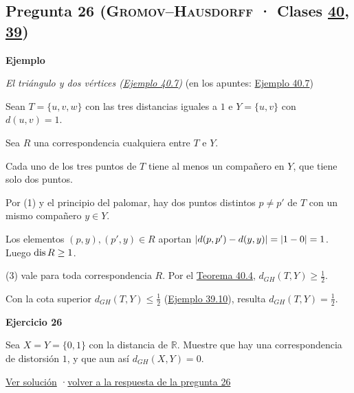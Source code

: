 \documentclass[11pt,a4paper]{article}
\newcommand{\R}{\mathbb{R}}\newcommand{\N}{\mathbb{N}}\newcommand{\Q}{\mathbb{Q}}
\newcommand{\bloque}[1]{\par\smallskip\noindent\textbf{\color{acento}#1}\par}
\begin{document}
\subsection*{\hypertarget{e-26}{}Pregunta 26 \normalfont\small(\textsc{Gromov–Hausdorff} · Clases \href{https://decostruttivismo.github.io/MAT2514-repaso/pdf/MAT2514_apuntes_completos.pdf\#nameddest=section.40}{40}, \href{https://decostruttivismo.github.io/MAT2514-repaso/pdf/MAT2514_apuntes_completos.pdf\#nameddest=section.39}{39})}
\bloque{Ejemplo}
\textit{El triángulo y dos vértices (\href{https://decostruttivismo.github.io/MAT2514-repaso/pdf/MAT2514_apuntes_completos.pdf\#nameddest=teorema.40.7}{Ejemplo 40.7})} {\small(en los apuntes: \href{https://decostruttivismo.github.io/MAT2514-repaso/pdf/MAT2514_apuntes_completos.pdf\#nameddest=teorema.40.7}{Ejemplo 40.7})}
\begin{pasos}
\item[] Sean $T=\{u,v,w\}$ con las tres distancias iguales a $1$ e $Y=\{u,v\}$ con $d(u,v)=1$.
\item[] Sea $R$ una correspondencia cualquiera entre $T$ e $Y$.
\item[(1)] Cada uno de los tres puntos de $T$ tiene al menos un compañero en $Y$, que tiene solo dos puntos.
\item[(2)] Por (1) y el principio del palomar, hay dos puntos distintos $p\ne p'$ de $T$ con un mismo compañero $y\in Y$.
\item[(3)] Los elementos $(p,y),(p',y)\in R$ aportan $\lvert d(p,p')-d(y,y)\rvert=\lvert 1-0\rvert=1$. Luego $\operatorname{dis} R\ge1$.
\item[(4)] (3) vale para toda correspondencia $R$. Por el \href{https://decostruttivismo.github.io/MAT2514-repaso/pdf/MAT2514_apuntes_completos.pdf\#nameddest=teorema.40.4}{Teorema 40.4}, $d_{GH}(T,Y)\ge\frac12$.
\item[] Con la cota superior $d_{GH}(T,Y)\le\frac12$ (\href{https://decostruttivismo.github.io/MAT2514-repaso/pdf/MAT2514_apuntes_completos.pdf\#nameddest=teorema.39.10}{Ejemplo 39.10}), resulta $d_{GH}(T,Y)=\frac12$.
\end{pasos}
\bloque{\hypertarget{x-26}{}Ejercicio 26}
Sea $X=Y=\{0,1\}$ con la distancia de $\R$. Muestre que hay una correspondencia de distorsión $1$, y que aun así $d_{GH}(X,Y)=0$.
\par{\small \hyperlink{s-26}{Ver solución} \quad·\quad \hyperlink{r-26}{volver a la respuesta de la pregunta 26}}
\end{document}
